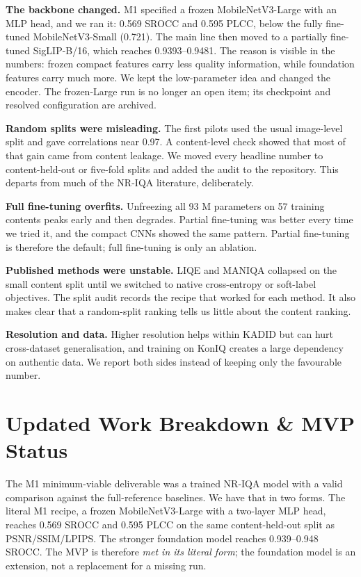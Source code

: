 \documentclass[11pt]{article}
\begin{document}
\textbf{The backbone changed.} M1 specified a frozen MobileNetV3-Large with an MLP head,
and we ran it: 0.569 SROCC and 0.595 PLCC, below the fully fine-tuned MobileNetV3-Small
(0.721). The main line then moved to a partially fine-tuned SigLIP-B/16, which reaches
0.9393--0.9481. The reason is visible in the numbers: frozen compact features carry less
quality information, while foundation features carry much more. We kept the low-parameter
idea and changed the encoder. The frozen-Large run is no longer an open item; its
checkpoint and resolved configuration are archived.

\textbf{Random splits were misleading.} The first pilots used the usual image-level split
and gave correlations near 0.97. A content-level check showed that most of that gain came
from content leakage. We moved every headline number to content-held-out or five-fold
splits and added the audit to the repository. This departs from much of the NR-IQA
literature, deliberately.

\textbf{Full fine-tuning overfits.} Unfreezing all 93 M parameters on 57 training contents
peaks early and then degrades. Partial fine-tuning was better every time we tried it, and
the compact CNNs showed the same pattern. Partial fine-tuning is therefore the default;
full fine-tuning is only an ablation.

\textbf{Published methods were unstable.} LIQE and MANIQA collapsed on the small content
split until we switched to native cross-entropy or soft-label objectives. The split audit
records the recipe that worked for each method. It also makes clear that a random-split
ranking tells us little about the content ranking.

\textbf{Resolution and data.} Higher resolution helps within KADID but can hurt
cross-dataset generalisation, and training on KonIQ creates a large dependency on authentic
data. We report both sides instead of keeping only the favourable number.

\section{Updated Work Breakdown \& MVP Status}
\label{sec:workbreakdown}

The M1 minimum-viable deliverable was a trained NR-IQA model with a valid comparison
against the full-reference baselines. We have that in two forms. The literal M1 recipe, a
frozen MobileNetV3-Large with a two-layer MLP head, reaches 0.569 SROCC and 0.595 PLCC on
the same content-held-out split as PSNR/SSIM/LPIPS. The stronger foundation model reaches
0.939--0.948 SROCC. The MVP is therefore \emph{met in its literal form}; the foundation
model is an extension, not a replacement for a missing run.
\end{document}
